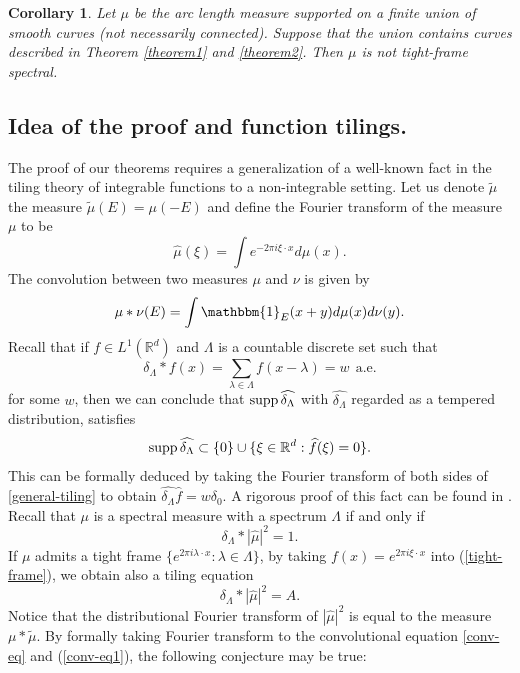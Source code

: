 \documentclass[12pt,a4paper,oneside]{amsart}
\newtheorem{corollary}{Corollary}
\theoremstyle{definition}
\newcommand{\RR}{{\mathbb R}}
\newcommand{\one}{{\mathbbm{1}}}
\newcommand{\supp}{{\rm supp\,}}
\newcommand{\ft}[1]{\widehat{#1}}
\newcommand{\wt}[1]{\widetilde{#1}}
\newcounter{rem}
\begin{document}
\begin{corollary}\label{corollary1}
Let $\mu$ be the arc length measure supported on a finite union of smooth curves (not necessarily connected). Suppose that the union contains curves described in Theorem \ref{theorem1} and \ref{theorem2}. Then $\mu$ is not tight-frame spectral.
\end{corollary}


\subsection{Idea of the proof and function tilings.} The proof of our theorems requires a generalization of a well-known fact in the tiling theory of integrable functions to a non-integrable setting. 
Let us denote $\wt\mu$ the measure $\wt\mu (E) = {\mu (-E)}$  and define the Fourier transform of the measure $\mu$  to be 
$$
\widehat{\mu}(\xi)  = \int e^{-2\pi i \xi \cdot x}d\mu(x). 
$$
The convolution between two measures $\mu$ and $\nu$ is given by 
$$
\mu\ast\nu (E) = \int \one_E (x+y) d\mu (x)d\nu (y).
$$  
Recall that if $f\in L^1(\RR^d)$ and $\Lambda$ is a countable discrete set such that 
\begin{equation}\label{general-tiling}
\delta_{\Lambda}\ast f(x) = \sum_{\lambda\in \Lambda} f(x-\lambda) = w ~~\text{a.e.}
\end{equation}
for some $w$, then we can conclude that $\supp\ft{\delta_{\Lambda}}$ with $\ft{\delta_{\Lambda}}$ regarded as a tempered distribution, satisfies
$$
\supp\ft{\delta_{\Lambda}} \subset \{0\}\cup \{\xi\in\RR^d: \widehat{f}(\xi) = 0\}. 
$$
This can be formally deduced by taking {the Fourier transform of both sides of \eqref{general-tiling} to obtain} $\ft{\delta_{\Lambda}} \ft{f} = w \delta_0$. A rigorous proof of this fact can be found in \cite[Theorem 4.1]{kolountzakis2016non}.
{Recall that \cite{jorgensen1998dense}} $\mu$ is a spectral measure with a spectrum $\Lambda$ if and only if
\begin{equation}\label{conv-eq}
\delta_{\Lambda}\ast|\ft{\mu}|^2 = 1.
\end{equation}
{If $\mu$ admits a tight frame $\{e^{2\pi i \lambda\cdot x}: \lambda\in \Lambda\}$, by taking $f(x) = e^{2\pi i \xi\cdot x}$ into (\ref{tight-frame}), we obtain also a tiling equation
\begin{equation}\label{conv-eq1}
\delta_{\Lambda}\ast|\ft{\mu}|^2 = A.
\end{equation}}
Notice that the distributional Fourier transform of $|\ft{\mu}|^2$ is equal to the measure $\mu\ast\wt{\mu}$. By formally taking Fourier transform to the convolutional equation {\eqref{conv-eq}} and (\ref{conv-eq1}), the following conjecture may be true:
\end{document}
